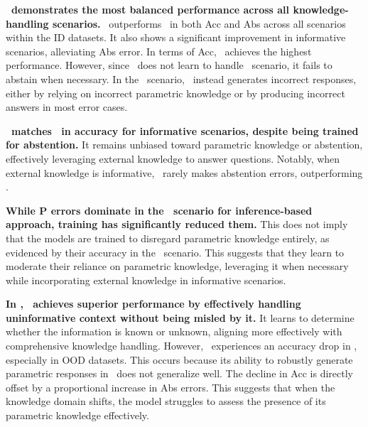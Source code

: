 \textbf{\ours\ demonstrates the most balanced performance across all knowledge-handling scenarios.}
\ours\ outperforms \absinst\ in both Acc and Abs across all scenarios within the ID datasets.
It also shows a significant improvement in informative scenarios, alleviating Abs error.
In terms of Acc, \baseline\ achieves the highest performance.
However, since \baseline\ does not learn to handle \UU\ scenario, it fails to abstain when necessary.
In the \UU\ scenario, \baseline\ instead generates incorrect responses, either by relying on incorrect parametric knowledge or by producing incorrect answers in most error cases.


\textbf{\ours\ matches \baseline\ in accuracy for informative scenarios, despite being trained for abstention.}
It remains unbiased toward parametric knowledge or abstention, effectively leveraging external knowledge to answer questions.
Notably, when external knowledge is informative, \ours\ rarely makes abstention errors, outperforming \absinst.


\textbf{While P errors dominate in the \KI\ scenario for inference-based approach, training has significantly reduced them.} 
This does not imply that the models are trained to disregard parametric knowledge entirely, as evidenced by their accuracy in the \KU\ scenario.
This suggests that they learn to moderate their reliance on parametric knowledge, leveraging it when necessary while incorporating external knowledge in informative scenarios.




\textbf{In \UU, \ours\ achieves superior performance by effectively handling uninformative context without being misled by it.}
It learns to determine whether the information is known or unknown, aligning more effectively with comprehensive knowledge handling.
However, \ours\ experiences an accuracy drop in \KU, especially in OOD datasets.
This occurs because its ability to robustly generate parametric responses in \KU\ does not generalize well.
The decline in Acc is directly offset by a proportional increase in Abs errors. 
This suggests that when the knowledge domain shifts, the model struggles to assess the presence of its parametric knowledge effectively.



